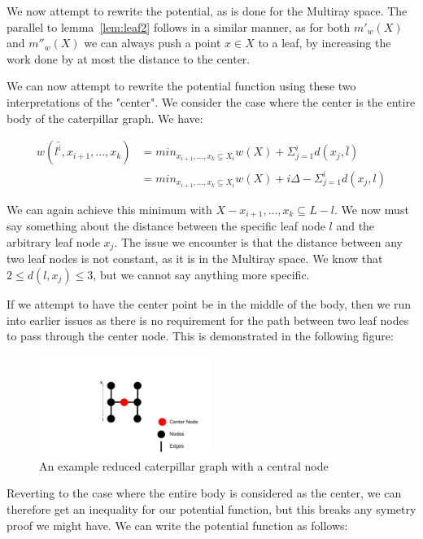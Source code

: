 We now attempt to rewrite the potential, as is done for the Multiray space. The parallel to lemma~\ref{lem:leaf2} follows in a similar manner, as for both $m'_w(X)$ and $m''_w(X)$ we can always push a point $x \in X$ to a leaf, by increasing the work done by at most the distance to the center.

We can now attempt to rewrite the potential function using these two interpretations of the "center". We consider the case where the center is the entire body of the caterpillar graph. We have:

\begin{equation*}
    \begin{split}
    w(\bar{l^i}, x_{i+1}, ..., x_k) &= min_{x_{i+1}, ..., x_k \subseteq X_i} w(X) + \Sigma_{j=1}^i d(x_j, \bar{l})\\
    &= min_{x_{i+1}, ..., x_k \subseteq X_i} w(X) + i\Delta - \Sigma_{j=1}^i d(x_j, l)
    \end{split}
\end{equation*}

We can again achieve this minimum with $X-x_{i+1}, ..., x_k\subseteq L-l$. We now must say something about the distance between the specific leaf node $l$ and the arbitrary leaf node $x_j$. The issue we encounter is that the distance between any two leaf nodes is not constant, as it is in the Multiray space. We know that $2 \leq d(l, x_j) \leq 3$, but we cannot say anything more specific. 

If we attempt to have the center point be in the middle of the body, then we run into earlier issues as there is no requirement for the path between two leaf nodes to pass through the center node. This is demonstrated in the following figure:

\begin{figure}[H]
    \centering
    \includegraphics[width=0.5\textwidth]{images/center2.png}
    \caption{An example reduced caterpillar graph with a central node}
\end{figure}

Reverting to the case where the entire body is considered as the center, we can therefore get an inequality for our potential function, but this breaks any symetry proof we might have. We can write the potential function as follows:

